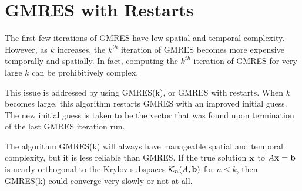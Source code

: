 \section*{GMRES with Restarts} %

The first few iterations of GMRES have low spatial and temporal complexity.
However, as $k$ increases, the $k^{th}$ iteration of GMRES becomes more expensive temporally and spatially.
In fact, computing the $k^{th}$ iteration of GMRES for very large $k$ can be prohibitively complex.

This issue is addressed by using GMRES(k), or GMRES with restarts.
When $k$ becomes large, this algorithm restarts GMRES with an improved initial guess.
The new initial guess is taken to be the vector that was found upon termination of the last GMRES iteration run.

The algorithm GMRES(k) will always have manageable spatial and temporal complexity, but it is less reliable than GMRES.
If the true solution $\mathbf{x}$ to $A\mathbf{x}=\mathbf{b}$ is nearly orthogonal to the Krylov subspaces $\mathcal{K}_n(A, \mathbf{b})$ for $n\leq k$, then GMRES(k) could converge very slowly or not at all.

